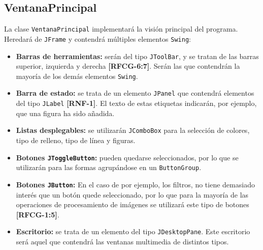 \subsection{VentanaPrincipal}
La clase \texttt{VentanaPrincipal} implementará la visión principal del programa. Heredará de \texttt{JFrame} y contendrá múltiples elementos \texttt{Swing}:
\begin{itemize}
\item{\textbf{Barras de herramientas:} serán del tipo \texttt{JToolBar}, y se tratan de las barras superior, izquierda y derecha \textbf{[RFCG-6:7]}. Serán las que contendrán la mayoría de los demás elementos \texttt{Swing}.}
\item{\textbf{Barra de estado:} se trata de un elemento \texttt{JPanel} que contendrá elementos del tipo \texttt{JLabel} \textbf{[RNF-1]}. El texto de estas etiquetas indicarán, por ejemplo, que una figura ha sido añadida.}
\item{\textbf{Listas desplegables:} se utilizarán \texttt{JComboBox} para la selección de colores, tipo de relleno, tipo de línea y figuras.}
\item{\textbf{Botones \texttt{JToggleButton}:} pueden quedarse seleccionados, por lo que se utilizarán para las formas agrupándose en un \texttt{ButtonGroup}.}
\item{\textbf{Botones \texttt{JButton}:} En el caso de por ejemplo, los filtros, no tiene demasiado interés que un botón quede seleccionado, por lo que para la mayoría de las operaciones de procesamiento de imágenes se utilizará este tipo de botones \textbf{[RFCG-1:5]}.}
\item{\textbf{Escritorio:} se trata de un elemento del tipo \texttt{JDesktopPane}. Este escritorio será aquel que contendrá las ventanas multimedia de distintos tipos.}
\end{itemize}
